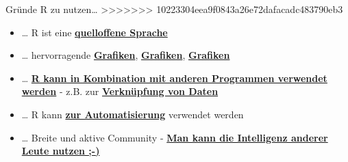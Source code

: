 \documentclass[ignorenonframetext,]{beamer}
\begin{document}
\begin{frame}{Gründe R zu nutzen\ldots{}}
\protect\hypertarget{grunde-r-zu-nutzen}{}
>>>>>>> 10223304eea9f0843a26e72dafacadc483790eb3

\begin{itemize}
\item
  \ldots{} R ist eine
  \href{https://stackoverflow.com/questions/1546583/what-is-the-definition-of-an-open-source-programming-language}{\textbf{quelloffene
  Sprache}}
\item
  \ldots{} hervorragende
  \href{http://matthewlincoln.net/2014/12/20/adjacency-matrix-plots-with-r-and-ggplot2.html}{\textbf{Grafiken}},
  \href{https://www.r-bloggers.com/3d-plots-with-ggplot2-and-plotly\%20/}{\textbf{Grafiken}},
  \href{https://procomun.wordpress.com/2011/03/18/splomr/}{\textbf{Grafiken}}
\item
  \ldots{} \href{https://github.com/Japhilko/RInterfaces}{\textbf{R kann
  in Kombination mit anderen Programmen verwendet werden}} - z.B. zur
  \href{https://github.com/Japhilko/RInterfaces/blob/master/slides/Datenimport.md}{\textbf{Verknüpfung
  von Daten}}
\item
  \ldots{} R kann
  \href{https://cran.r-project.org/web/packages/MplusAutomation/index.html}{\textbf{zur
  Automatisierung}} verwendet werden
\item
  \ldots{} Breite und aktive Community -
  \href{https://www.r-bloggers.com/}{\textbf{Man kann die Intelligenz
  anderer Leute nutzen ;-)}}
\end{itemize}

\end{frame}
\end{document}
